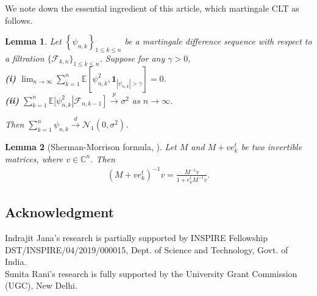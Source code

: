 \documentclass[12pt]{amsart}
\theoremstyle{plain}
\newtheorem{appendixlemma}{Lemma}[section]
\theoremstyle{definition}
\begin{document}
We note down the essential ingredient of this article, which martingale CLT as follows.
\begin{appendixlemma}\label{lemma:MCLT}\cite[Theorem 35.12]{billingsley2017probability}
    Let $\left\{\psi_{n, k}\right\}_{1 \leq k \leq n}$ be a martingale difference sequence with respect to a filtration $\{\mathcal{F}_{k,n}\}_{1\leq k\leq n}$. Suppose for any $\gamma>0$,\\
    \textbf{(i)} \label{MCLT i} $\lim _{n \rightarrow \infty} \sum_{k=1}^n \mathbb{E}[\psi_{n, k}^2, \mathbf{1}_{|\psi_{n, k}|>\gamma}]=0$.\\
    \textbf{(ii)} \label{MCLT ii} $\sum_{k=1}^n \mathbb{E}[\psi_{n, k}^2\left|\mathcal{F}_{n,k-1}\right] \stackrel{p}{\rightarrow} \sigma^2$ as $n \rightarrow \infty$.

    Then $\sum_{k=1}^n \psi_{n, k} \stackrel{d}\rightarrow \mathcal{N}_1\left(0, \sigma^2\right)$.
\end{appendixlemma}
\begin{appendixlemma}[Sherman-Morrison formula, \cite{sherman1950adjustment}]\label{lem: sherman morrison}
   Let $M$ and $M+ve_{k}^{t}$ be two invertible matrices, where $v\in \mathbb{C}^{n}$. Then
    \begin{align*}
    (M+v e_{k}^{t})^{-1}v=\frac{M^{-1}v}{1+e_{k}^{t}M^{-1}v}.
    \end{align*}
    \end{appendixlemma}

    
\subsection*{Acknowledgment} Indrajit Jana's research is partially supported by INSPIRE Fellowship\\DST/INSPIRE/04/2019/000015, Dept. of Science and Technology, Govt. of India.\\

Sunita Rani's research is fully supported by the University Grant Commission (UGC), New Delhi.
\end{document}
